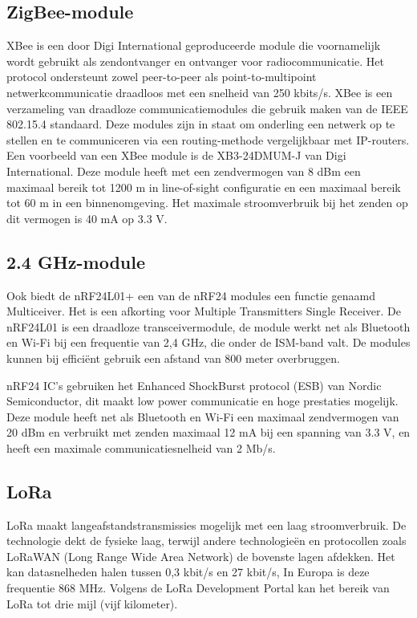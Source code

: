 \subsection{ZigBee-module}
XBee is een door Digi International geproduceerde module die voornamelijk wordt gebruikt als zendontvanger en ontvanger voor radiocommunicatie. Het protocol ondersteunt zowel peer-to-peer als point-to-multipoint netwerkcommunicatie draadloos met een snelheid van 250 kbits/s. XBee is een verzameling van draadloze communicatiemodules die gebruik maken van de IEEE 802.15.4 standaard. Deze modules zijn in staat om onderling een netwerk op te stellen en te communiceren via een routing-methode vergelijkbaar met IP-routers. Een voorbeeld van een XBee module is de XB3-24DMUM-J van Digi International. Deze module heeft met een zendvermogen van 8 dBm een maximaal bereik tot 1200 m in line-of-sight configuratie en een maximaal bereik tot 60 m in een binnenomgeving. Het maximale stroomverbruik bij het zenden op dit vermogen is 40 mA op 3.3 V.

\subsection{2.4 GHz-module}
Ook biedt de nRF24L01+ een van de nRF24 modules een functie genaamd Multiceiver. Het is een afkorting voor Multiple Transmitters Single Receiver. De nRF24L01 is een draadloze transceivermodule, de module werkt net als Bluetooth en Wi-Fi bij een frequentie van 2,4 GHz, die onder de ISM-band valt. De modules kunnen bij efficiënt gebruik een afstand van 800 meter overbruggen\cite{nordic_nrf24}. 

nRF24 IC's gebruiken het Enhanced ShockBurst protocol (ESB) van Nordic Semiconductor, dit maakt low power communicatie en hoge prestaties mogelijk. Deze module heeft net als Bluetooth en Wi-Fi een maximaal zendvermogen van 20 dBm en verbruikt met zenden maximaal 12 mA bij een spanning van 3.3 V, en heeft een maximale communicatiesnelheid van 2 Mb/s\cite{digikey_lp_wireless}.


\subsection{LoRa}
LoRa maakt langeafstandstransmissies mogelijk met een laag stroomverbruik. De technologie dekt de fysieke laag, terwijl andere technologieën en protocollen zoals LoRaWAN (Long Range Wide Area Network) de bovenste lagen afdekken. Het kan datasnelheden halen tussen 0,3 kbit/s en 27 kbit/s, In Europa is deze frequentie 868 MHz. Volgens de LoRa Development Portal kan het bereik van LoRa tot drie mijl (vijf kilometer). \cite{rf_lora}


